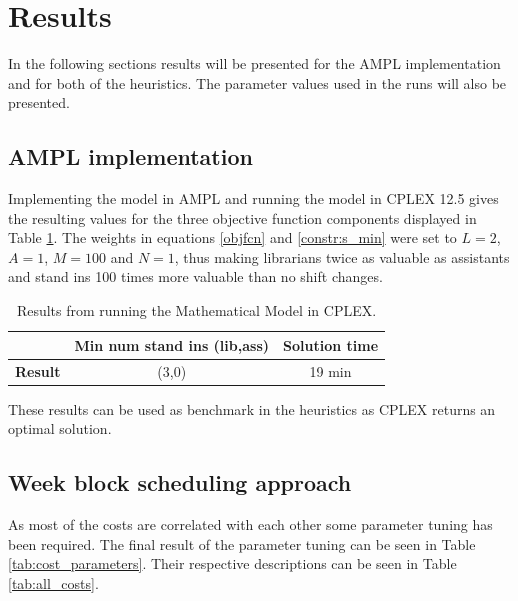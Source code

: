 \section{Results}
In the following sections results will be presented for the AMPL implementation and for both of the heuristics. The parameter values used in the runs will also be presented. 

\subsection{AMPL implementation}

Implementing the model in AMPL and running the model in CPLEX 12.5 gives the resulting values for the three objective function components displayed in Table \ref{tab:CPLEX_res}. The weights in equations \ref{objfcn} and \ref{constr:s_min} were set to $L = 2$, $A = 1$, $M =100$ and $N=1$, thus making librarians twice as valuable as assistants and stand ins 100 times more valuable than no shift changes. 

\begin{table}[!h]
\centering
\label{tab:CPLEX_res}
\caption{Results from running the Mathematical Model in CPLEX.}
\begin{tabular}{|l|l|l|}
\hline
\rowcolor{Gray} & \textbf{Min num stand ins (lib,ass)} & \textbf{Solution time} \\ \hline
\cellcolor{Gray} \textbf{Result} & \multicolumn{1}{c|}{(3,0)} & \multicolumn{1}{c|}{19 min} \\
\hline
\end{tabular}
\end{table}

These results can be used as benchmark in the heuristics as CPLEX returns an optimal solution. 

\subsection{Week block scheduling approach}
As most of the costs are correlated with each other some parameter tuning has been required. The final result of the parameter tuning can be seen in Table \ref{tab:cost_parameters}. Their respective descriptions can be seen in Table \ref{tab:all_costs}. 

